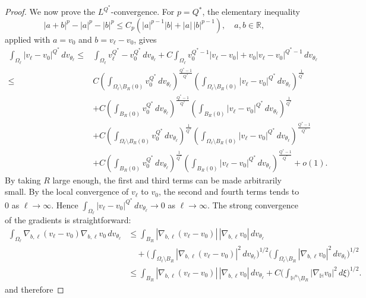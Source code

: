 \documentclass[11pt]{article}
\numberwithin{equation}{section}
\numberwithin{equation}{section}
\begin{document}
\begin{proof}
		We now prove the \(L^{Q^*}\)-convergence. For \(p=Q^*\), the elementary inequality
		\[
		|a+b|^p-|a|^p-|b|^p \le C_p(|a|^{p-1}|b|+|a|\,|b|^{p-1}), \quad a,b\in\mathbb R,
		\]
		applied with \(a=v_0\) and \(b=v_\ell-v_0\), gives
		\[
		\begin{aligned}
			\int_{\Omega_\ell} |v_\ell - v_0|^{Q^*}\,d v_{\theta_{\ell}} \le &\int_{\Omega_\ell} v_\ell^{Q^*} - v_0^{Q^*}\,d v_{\theta_{\ell}} + C \int_{\Omega_\ell} v_0^{Q^*-1} |v_\ell - v_0| + v_0|v_\ell - v_0|^{Q^*-1}\,d v_{\theta_{\ell}} \\
			\le &C ( \int_{\Omega_\ell\setminus B_R(0)} v_0^{Q^*}\,d v_{\theta_{\ell}} )^{\frac{Q^*-1}{Q^*}} ( \int_{\Omega_\ell\setminus B_R(0)} |v_\ell - v_0|^{Q^*}\,d v_{\theta_{\ell}} )^{\frac{1}{Q^*}} \\
			& + C ( \int_{B_R(0)} v_0^{Q^*}\,d v_{\theta_{\ell}} )^{\frac{Q^*-1}{Q^*}} ( \int_{B_R(0)} |v_\ell - v_0|^{Q^*}\,d v_{\theta_{\ell}} )^{\frac{1}{Q^*}} \\
			& + C ( \int_{\Omega_\ell\setminus B_R(0)} v_0^{Q^*}\,d v_{\theta_{\ell}} )^{\frac{1}{Q^*}} ( \int_{\Omega_\ell\setminus B_R(0)} |v_\ell - v_0|^{Q^*}\,d v_{\theta_{\ell}} )^{\frac{Q^*-1}{Q^*}} \\
			& + C ( \int_{B_R(0)} v_0^{Q^*}\,d v_{\theta_{\ell}} )^{\frac{1}{Q^*}} ( \int_{B_R(0)} |v_\ell - v_0|^{Q^*}\,d v_{\theta_{\ell}} )^{\frac{Q^*-1}{Q^*}}+o(1).
		\end{aligned}
		\]
		By taking \(R\) large enough, the first and third terms can be made arbitrarily small. By the local convergence of \(v_\ell\) to \(v_0\), the second and fourth terms tends to \(0\) as \(\ell \to \infty\). Hence \(\int_{\Omega_\ell} |v_\ell - v_0|^{Q^*}\,d v_{\theta_{\ell}} \to 0\) as \(\ell\to\infty\). The strong convergence of the gradients is straightforward:
		\[
		\begin{aligned}
			\int_{\Omega_\ell} \nabla_{b,\ell}(v_\ell-v_0)\nabla_{b,\ell}v_0\,dv_{\theta_\ell} &\le \int_{B_R} |\nabla_{b,\ell}(v_\ell-v_0)|\,|\nabla_{b,\ell}v_0| \,dv_{\theta_\ell} \\
			&\quad+ \Big( \int_{\Omega_\ell\setminus B_R} |\nabla_{b,\ell}(v_\ell-v_0)|^2\,dv_{\theta_\ell} \Big)^{1/2} \Big( \int_{\Omega_\ell\setminus B_R} |\nabla_{b,\ell}v_0|^2\,dv_{\theta_\ell} \Big)^{1/2} \\
			&\le \int_{B_R} |\nabla_{b,\ell}(v_\ell-v_0)|\,|\nabla_{b,\ell}v_0| \,dv_{\theta_\ell} + C \Big( \int_{\mathbb H^n\setminus B_R} |\nabla_{\mathbb H}v_0|^2\,d\xi \Big)^{1/2}.
		\end{aligned}
		\]
		and therefore

\end{proof}
\end{document}
